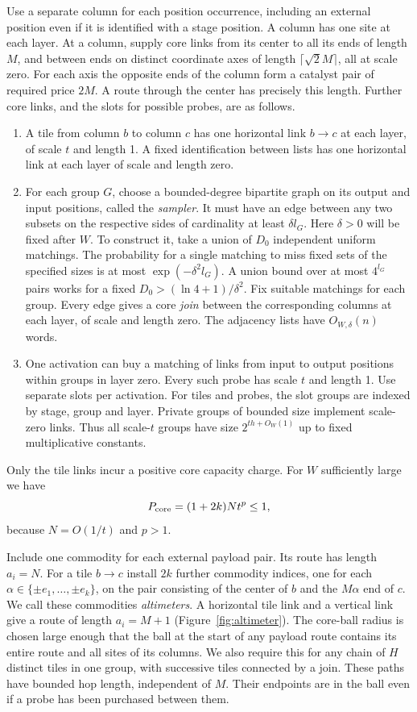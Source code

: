 Use a separate column for each position occurrence, including an external
position even if it is identified with a stage position. A column has one
site at each layer. At a column, supply core links from its center to all
its ends of length \(M\), and between ends on distinct coordinate axes
of length \(\lceil\sqrt{2}M\rceil\), all at scale zero. For each axis the
opposite ends of the column form a catalyst pair of required price \(2M\).
A route through the center has precisely this length. Further core links,
and the slots for possible probes, are as follows.
\begin{enumerate}
\item A tile from column \(b\) to column \(c\) has one horizontal link
\(b\to c\) at each layer, of scale \(t\) and length 1. A fixed identification
between lists has one horizontal link at each layer of scale and length
zero.
\item For each group $G$, choose a bounded-degree bipartite graph on its
output and input positions, called the \emph{sampler}. It must have
an edge between any two subsets
on the respective sides of cardinality at least \(\delta l_G\). Here
\(\delta>0\) will be fixed after \(W\). To construct it, take a union of
\(D_0\) independent uniform matchings. The probability for a single
matching to miss fixed sets of the specified sizes is at most
\(\exp(-\delta^2 l_G)\). A union bound over at most \(4^{l_G}\) pairs
works for a fixed \(D_0>(\ln 4+1)/\delta^2\). Fix suitable matchings for each group.
Every edge gives a core \emph{join} between the corresponding columns
at each layer, of scale and length zero. The adjacency lists have
\(O_{W,\delta}(n)\) words.
\item One activation can buy a matching of links from input to output
positions within groups in layer zero. Every such probe has scale \(t\)
and length 1. Use separate slots per activation. For tiles and probes,
the slot groups are indexed by stage, group and layer. Private groups
of bounded size implement scale-zero links. Thus all scale-\(t\) groups
have size \(2^{th+O_W(1)}\) up to fixed multiplicative constants.
\end{enumerate}
Only the tile links incur a positive core capacity charge. For \(W\)
sufficiently large we have
\[
  P_{\rm core}=(1+2k)Nt^p\le1 ,
\]
because \(N=O(1/t)\) and \(p>1\).

Include one commodity for each external payload pair. Its route has
length \(a_i=N\). For a tile \(b\to c\) install \(2k\) further commodity
indices, one for each \(\alpha\in\{\pm e_1,\ldots,\pm e_k\}\), on the
pair consisting of the center of \(b\) and the \(M\alpha\) end of \(c\).
We call these commodities \emph{altimeters}. A horizontal tile link and
a vertical link give a route of length \(a_i=M+1\) (Figure~\ref{fig:altimeter}). The core-ball radius
is chosen large enough that the ball at the start of any payload route
contains its entire route and all sites of its columns. We also require
this for any chain of \(H\) distinct tiles in one group, with successive
tiles connected by a join. These paths have bounded hop length,
independent of \(M\). Their endpoints are in the ball even if a probe
has been purchased between them.

